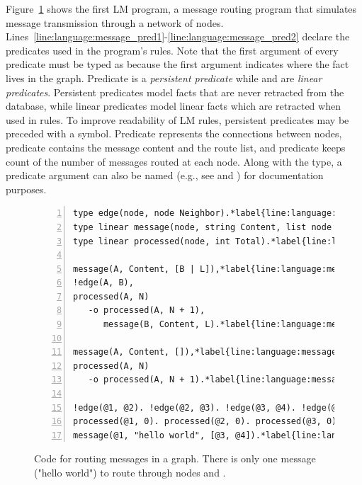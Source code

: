 
Figure~\ref{code:language:message} shows the first LM program, a message routing
program that simulates message transmission through a network of nodes.
Lines~\ref{line:language:message_pred1}-\ref{line:language:message_pred2}
declare the predicates used in the program's rules. Note that the first argument
of every predicate must be typed as  because the first argument
indicates where the fact lives in the graph. Predicate  is a
\emph{persistent predicate} while  and  are
\emph{linear predicates}. Persistent predicates model facts that are never
retracted from the database, while linear predicates model linear facts which
are retracted when used in rules. To improve readability of LM rules, persistent
predicates may be preceded with a \code{!} symbol. Predicate 
represents the connections between nodes, predicate  contains the
message content and the route list, and predicate  keeps count
of the number of messages routed at each node. Along with the type, a predicate
argument can also be named (e.g., see  and ) for
documentation purposes.

\begin{figure}[h!]
\begin{Verbatim}[numbers=left,commandchars=\*\{\},fontsize=\codesize]
type edge(node, node Neighbor).*label{line:language:message_pred1}*hfill// Predicate declaration
type linear message(node, string Content, list node Routing).
type linear processed(node, int Total).*label{line:language:message_pred2}

message(A, Content, [B | L]),*label{line:language:message_first1}*hfill// Rule 1
!edge(A, B),
processed(A, N)
   -o processed(A, N + 1),
      message(B, Content, L).*label{line:language:message_first2}

message(A, Content, []),*label{line:language:message_second1}*hfill// Rule 2
processed(A, N)
   -o processed(A, N + 1).*label{line:language:message_second2}

!edge(@1, @2). !edge(@2, @3). !edge(@3, @4). !edge(@1, @3).*label{line:language:message_axioms}*hfill// Initial facts
processed(@1, 0). processed(@2, 0). processed(@3, 0). processed(@4, 0).
message(@1, "hello world", [@3, @4]).*label{line:language:message_message}
\end{Verbatim}
\caption{Code for routing messages in a graph. There is only one message ("hello
world") to route through nodes  and .}
\label{code:language:message}
\end{figure}

